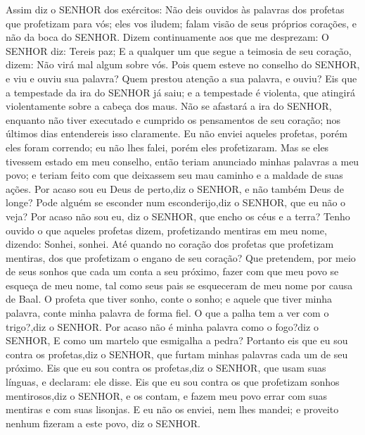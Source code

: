 {Assim diz o SENHOR dos exércitos: Não deis ouvidos às palavras dos profetas que profetizam para vós; eles vos iludem;
 falam visão de seus próprios corações, e não da boca do SENHOR.
Dizem continuamente aos que me desprezam: O SENHOR diz: Tereis paz; E a qualquer um que segue a teimosia de seu
{} coração, dizem: Não virá mal algum sobre vós.
Pois quem esteve no conselho do SENHOR, e viu e ouviu sua palavra? Quem prestou atenção a sua palavra, e
{} ouviu?
Eis que a tempestade da ira do SENHOR já saiu; e a tempestade é violenta, que atingirá violentamente sobre a cabeça dos maus.
Não se afastará a ira do SENHOR, enquanto não tiver executado e cumprido os pensamentos de seu coração; nos últimos dias
 entendereis isso claramente.
Eu não enviei aqueles profetas, porém eles foram correndo; eu não lhes falei, porém eles profetizaram.
Mas se eles tivessem estado em meu conselho, então teriam anunciado minhas palavras a meu povo; e teriam feito com que deixassem seu mau caminho e a maldade de suas ações.
Por acaso sou eu Deus
{} de perto,diz o SENHOR, e não também Deus de longe?
Pode alguém se esconder num esconderijo,diz o SENHOR, que eu não o veja? Por acaso não sou eu, diz o SENHOR, que encho os céus e a terra?
Tenho ouvido o que aqueles profetas dizem, profetizando mentiras em meu nome, dizendo: Sonhei, sonhei.
Até quando
{} no coração dos profetas que profetizam mentiras, dos que profetizam o engano de seu coração?
Que pretendem, por meio de seus sonhos que cada um conta a seu próximo, fazer com que meu povo se esqueça de meu nome, tal como seus pais se esqueceram de meu nome por causa de Baal.
O profeta que tiver sonho, conte o sonho; e aquele que tiver minha palavra, conte minha palavra de forma fiel. O que a palha tem a ver com o trigo?,diz o SENHOR.
Por acaso não é minha palavra como o fogo?diz o SENHOR, E como um martelo que esmigalha a pedra?
Portanto eis que eu sou contra os profetas,diz o SENHOR, que furtam minhas palavras cada um de seu próximo.
Eis que eu sou contra os profetas,diz o SENHOR, que usam suas línguas, e declaram:
{} ele disse.
Eis que eu sou contra os que profetizam sonhos mentirosos,diz o SENHOR, e os contam, e fazem meu povo errar com suas mentiras e com suas lisonjas. E eu não os enviei, nem lhes mandei; e proveito nenhum fizeram a este povo, diz o SENHOR.
}
